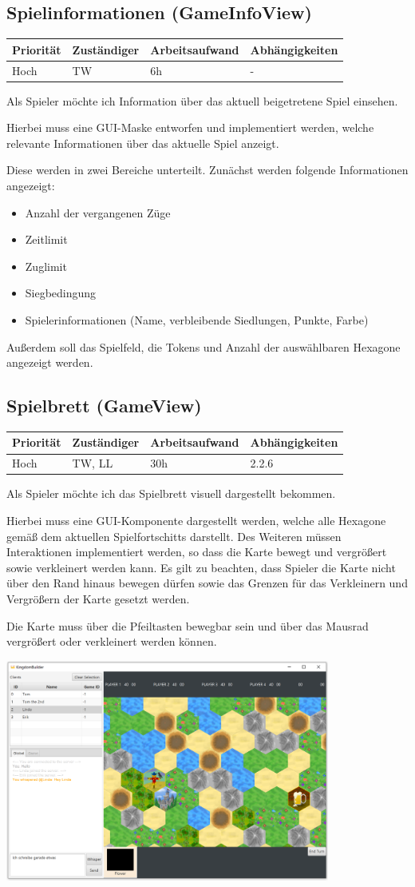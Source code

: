 \documentclass[a4paper]{scrreprt}
\newenvironment{requirement}[5] {
	\subsection{#1}
	\begin{tabularx}{\textwidth}{|X|l|X|X|}
		\hline
		Priorität & Zuständiger & Arbeitsaufwand & Abhängigkeiten \\
		\hline
		#2 & #3 & #4 & #5 \\
		\hline
	\end{tabularx}
	}{
	\newpage
	}
\begin{document}
\begin{requirement}{Spielinformationen (GameInfoView)}{Hoch}{TW}{6h}{-}

\begin{center}
	Als Spieler möchte ich Information über das aktuell beigetretene Spiel einsehen.
\end{center}

Hierbei muss eine GUI-Maske entworfen und implementiert werden, welche relevante Informationen über das aktuelle Spiel anzeigt.

Diese werden in zwei Bereiche unterteilt. Zunächst werden folgende Informationen angezeigt:
\begin{itemize}
	\item Anzahl der vergangenen Züge
	\item Zeitlimit
	\item Zuglimit
	\item Siegbedingung
	\item Spielerinformationen (Name, verbleibende Siedlungen, Punkte, Farbe)
\end{itemize}

Außerdem soll das Spielfeld, die Tokens und Anzahl der auswählbaren Hexagone angezeigt werden.

\end{requirement}



\begin{requirement}{Spielbrett (GameView)}{Hoch}{TW, LL}{30h}{2.2.6}

\begin{center}
	Als Spieler möchte ich das Spielbrett visuell dargestellt bekommen.
\end{center}

Hierbei muss eine GUI-Komponente dargestellt werden, welche alle Hexagone gemäß dem aktuellen Spielfortschitts darstellt. Des Weiteren müssen Interaktionen implementiert werden,
so dass die Karte bewegt und vergrößert sowie verkleinert werden kann. Es gilt zu beachten, dass Spieler die Karte nicht über den Rand hinaus bewegen dürfen sowie das Grenzen für das Verkleinern und Vergrößern der Karte gesetzt werden.

Die Karte muss über die Pfeiltasten bewegbar sein und über das Mausrad vergrößert oder verkleinert werden können.

\includegraphics[width=0.8\textwidth]{view5.png}

\end{requirement}
\end{document}
